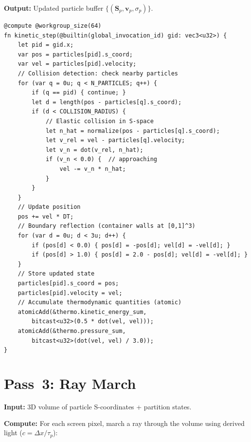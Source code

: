 \documentclass[twocolumn,10pt,a4paper]{article}
\theoremstyle{plain}
\theoremstyle{definition}
\theoremstyle{remark}
\newcommand{\Scoord}{\mathbf{S}}
\newcommand{\taup}{\tau_p}
\begin{document}
\textbf{Output:} Updated particle buffer $\{(\Scoord_p, \mathbf{v}_p, \sigma_p)\}$.

\begin{lstlisting}[style=wgsl,caption={Pass 2: Kinetic Integration (WGSL pseudocode)}]
@compute @workgroup_size(64)
fn kinetic_step(@builtin(global_invocation_id) gid: vec3<u32>) {
    let pid = gid.x;
    var pos = particles[pid].s_coord;
    var vel = particles[pid].velocity;
    // Collision detection: check nearby particles
    for (var q = 0u; q < N_PARTICLES; q++) {
        if (q == pid) { continue; }
        let d = length(pos - particles[q].s_coord);
        if (d < COLLISION_RADIUS) {
            // Elastic collision in S-space
            let n_hat = normalize(pos - particles[q].s_coord);
            let v_rel = vel - particles[q].velocity;
            let v_n = dot(v_rel, n_hat);
            if (v_n < 0.0) {  // approaching
                vel -= v_n * n_hat;
            }
        }
    }
    // Update position
    pos += vel * DT;
    // Boundary reflection (container walls at [0,1]^3)
    for (var d = 0u; d < 3u; d++) {
        if (pos[d] < 0.0) { pos[d] = -pos[d]; vel[d] = -vel[d]; }
        if (pos[d] > 1.0) { pos[d] = 2.0 - pos[d]; vel[d] = -vel[d]; }
    }
    // Store updated state
    particles[pid].s_coord = pos;
    particles[pid].velocity = vel;
    // Accumulate thermodynamic quantities (atomic)
    atomicAdd(&thermo.kinetic_energy_sum,
        bitcast<u32>(0.5 * dot(vel, vel)));
    atomicAdd(&thermo.pressure_sum,
        bitcast<u32>(dot(vel, vel) / 3.0));
}
\end{lstlisting}

\section{Pass~3: Ray March}
\label{sec:pass3}

\textbf{Input:} 3D volume of particle S-coordinates + partition states.

\textbf{Compute:} For each screen pixel, march a ray through the volume using derived light ($c = \Delta x/\taup$):
\end{document}
